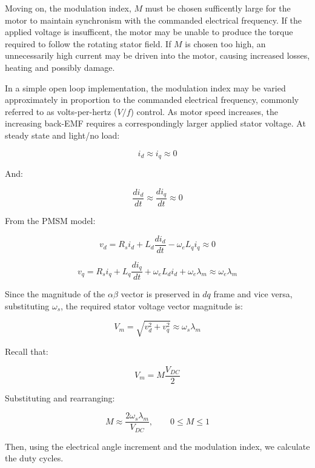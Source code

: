 \documentclass{article}
\begin{document}
Moving on, the modulation index, $M$ must be chosen sufficently large for the motor to maintain synchronism with the commanded electrical frequency. If the applied voltage is insufficent, the motor may be unable to produce the torque required to follow the rotating stator field. If $M$ is chosen too high, an unnecessarily high current may be driven into the motor, causing increased losses, heating and possibly damage.

In a simple open loop implementation, the modulation index may be varied approximately in proportion to the commanded electrical frequency, commonly referred to as volts-per-hertz ($V/f$) control. As motor speed increases, the increasing back-EMF requires a correspondingly larger applied stator voltage. At steady state and light/no load:

\[
    i_d \approx i_q \approx 0
\]

And:

\[
    \frac{di_d}{dt} \approx \frac{di_q}{dt} \approx 0
\]

From the PMSM model: 

\begin{equation}
    v_d = R_si_d + L_d\frac{di_d}{dt} - \omega_eL_qi_q \approx 0
\end{equation}

\begin{equation}
    v_q = R_si_q + L_q\frac{di_q}{dt} + \omega_eL_di_d + \omega_e\lambda_m \approx \omega_e\lambda_m
\end{equation}

Since the magnitude of the $\alpha\beta$ vector is preserved in $dq$ frame and vice versa, substituting $\omega_s$, the required stator voltage vector magnitude is:

\begin{equation}
    V_m = \sqrt{v_d^2 + v_q^2} \approx \omega_s\lambda_m
\end{equation}

Recall that:

\begin{equation}
    V_m = M\frac{V_{DC}}{2}
\end{equation}

Substituting and rearranging:

\begin{equation}
    M \approx \frac{2\omega_s\lambda_m}{V_{DC}}, \qquad
    0 \leq M \leq 1
\end{equation}

Then, using the electrical angle increment and the modulation index, we calculate the duty cycles.
\end{document}
